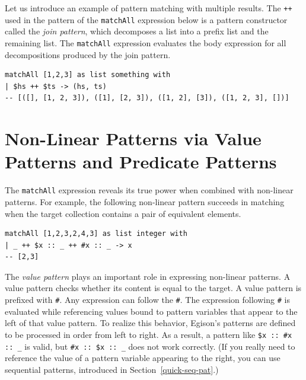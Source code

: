 Let us introduce an example of pattern matching with multiple results.
The \lstinline{++} used in the pattern of the \lstinline{matchAll} expression below is a pattern constructor called the \emph{join pattern}, which decomposes a list into a prefix list and the remaining list.
The \lstinline{matchAll} expression evaluates the body expression for all decompositions produced by the join pattern.
\begin{lstlisting}[language=egison,numbers=none]
matchAll [1,2,3] as list something with
| $hs ++ $ts -> (hs, ts)
-- [([], [1, 2, 3]), ([1], [2, 3]), ([1, 2], [3]), ([1, 2, 3], [])]
\end{lstlisting}

\section{Non-Linear Patterns via Value Patterns and Predicate Patterns}\label{quick-value-pat}

The \lstinline{matchAll} expression reveals its true power when combined with non-linear patterns.
For example, the following non-linear pattern succeeds in matching when the target collection contains a pair of equivalent elements.
\begin{lstlisting}[language=egison,numbers=none]
matchAll [1,2,3,2,4,3] as list integer with
| _ ++ $x :: _ ++ #x :: _ -> x
-- [2,3]
\end{lstlisting}

The \emph{value pattern} plays an important role in expressing non-linear patterns.
A value pattern checks whether its content is equal to the target.
A value pattern is prefixed with \lstinline{#}.
Any expression can follow the \lstinline{#}.
The expression following \lstinline{#} is evaluated while referencing values bound to pattern variables that appear to the left of that value pattern.
To realize this behavior, Egison's patterns are defined to be processed in order from left to right.
As a result, a pattern like \lstinline{$x :: #x :: _} is valid, but \lstinline{#x :: $x :: _} does not work correctly.
(If you really need to reference the value of a pattern variable appearing to the right, you can use sequential patterns, introduced in Section~\ref{quick-seq-pat}.)

